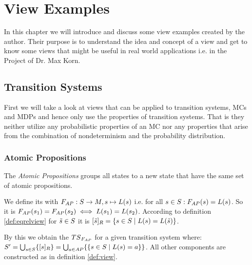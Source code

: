 \documentclass[preview]{standalone}
\begin{document}
\section{View Examples}
In this chapter we will introduce and discuss some view examples created by the author. Their purpose is to understand the idea and concept of a view and get to know some views that might be useful in real world applications i.e. in the Project of Dr. Max Korn.
\subsection{Transition Systems}
First we will take a look at views that can be applied to transition systems, MCs and MDPs and hence only use the properties of transition systems. That is they neither utilize any probabilistic properties of an MC nor any properties that arise from the combination of nondeterminism and the probability distribution.
\subsubsection{Atomic Propositions}
The \emph{Atomic Propositions \viewNC} groups all states to a new state that have the same set of atomic propositions.

\begin{definition}
\end{definition}

We define its \grpfctN with $\gfctatomicprops : \states \to \imggrp, {\state}\mapsto{\labelingfct(\state)}$ i.e. for all ${s} \in {S} : {{{{F}}_{AP}}}({s}) = {L}({s})$. So it is ${{{{F}}_{AP}}}({s}_1) = {{{{F}}_{AP}}}({s}_2) \iff {L}({s}_1) = {L}({s}_2)$. According to definition \ref{def:eqrelview} for ${\tilde{{s}}} \in {S}$ it is ${{[{\tilde{{s}}}]_{{R}}}} = \{{s} \in {S} \mid {L}({s}) = {L}({\tilde{{s}}})\}$.

By this we obtain the \viewN ${{{TS}_{{{{F}}_{AP}}}}}$ for a given transition system \ts where: ${S}' = \bigcup_{{s} \in {S}} \{{{[{s}]_{{R}}}}\} =  \bigcup_{a \in {AP}} \{\{{s} \in {S} \mid {L}({s}) = a\}\}$. All other components are constructed as in definition \ref{def:view}.
\end{document}
